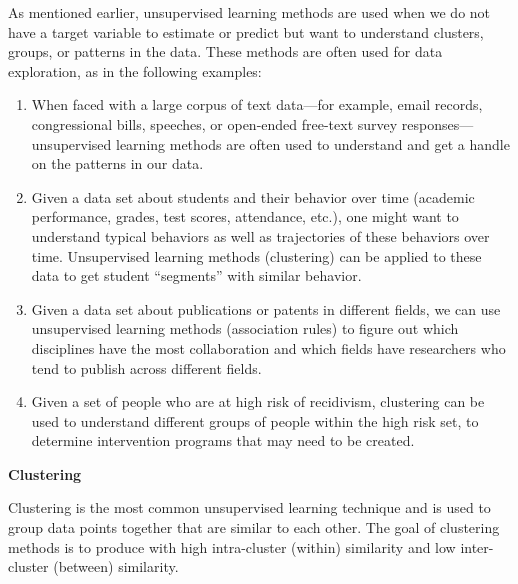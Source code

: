\documentclass[]{krantz}
\begin{document}
As mentioned earlier, unsupervised learning methods are used when we do
not have a target variable to estimate or predict but want to understand
clusters, groups, or patterns in the data. These methods are often used
for data exploration, as in the following examples:

\begin{enumerate}
\def\labelenumi{\arabic{enumi}.}
\item
  When faced with a large corpus of text data---for example, email
  records, congressional bills, speeches, or open-ended free-text survey
  responses---unsupervised learning methods are often used to understand
  and get a handle on the patterns in our data.
\item
  Given a data set about students and their behavior over time (academic
  performance, grades, test scores, attendance, etc.), one might want to
  understand typical behaviors as well as trajectories of these
  behaviors over time. Unsupervised learning methods (clustering) can be
  applied to these data to get student ``segments'' with similar
  behavior.
\item
  Given a data set about publications or patents in different fields, we
  can use unsupervised learning methods (association rules) to figure
  out which disciplines have the most collaboration and which fields
  have researchers who tend to publish across different fields.
\item
  Given a set of people who are at high risk of recidivism, clustering
  can be used to understand different groups of people within the high
  risk set, to determine intervention programs that may need to be
  created.
\end{enumerate}

\textbf{Clustering}

Clustering is the most common unsupervised learning technique and is
used to group data points together that are similar to each other. The
goal of clustering methods is to produce with high intra-cluster
(within) similarity and low inter-cluster (between) similarity.
\end{document}

